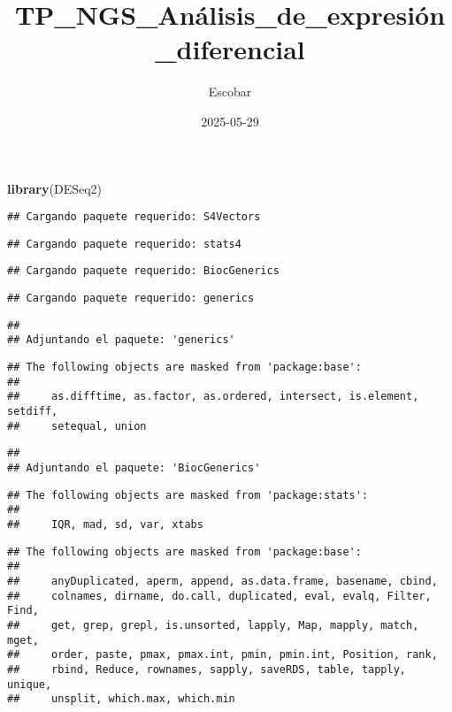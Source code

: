 \documentclass[
]{article}
\title{TP\_NGS\_Análisis\_de\_expresión\_diferencial}
\author{Escobar}
\date{2025-05-29}
\newenvironment{Shaded}{\begin{snugshade}}{\end{snugshade}}
\newcommand{\FunctionTok}[1]{\textcolor[rgb]{0.13,0.29,0.53}{\textbf{#1}}}
\newcommand{\NormalTok}[1]{#1}
\begin{document}
\maketitle

\begin{Shaded}
\begin{Highlighting}[]
\FunctionTok{library}\NormalTok{(DESeq2)}
\end{Highlighting}
\end{Shaded}

\begin{verbatim}
## Cargando paquete requerido: S4Vectors
\end{verbatim}

\begin{verbatim}
## Cargando paquete requerido: stats4
\end{verbatim}

\begin{verbatim}
## Cargando paquete requerido: BiocGenerics
\end{verbatim}

\begin{verbatim}
## Cargando paquete requerido: generics
\end{verbatim}

\begin{verbatim}
## 
## Adjuntando el paquete: 'generics'
\end{verbatim}

\begin{verbatim}
## The following objects are masked from 'package:base':
## 
##     as.difftime, as.factor, as.ordered, intersect, is.element, setdiff,
##     setequal, union
\end{verbatim}

\begin{verbatim}
## 
## Adjuntando el paquete: 'BiocGenerics'
\end{verbatim}

\begin{verbatim}
## The following objects are masked from 'package:stats':
## 
##     IQR, mad, sd, var, xtabs
\end{verbatim}

\begin{verbatim}
## The following objects are masked from 'package:base':
## 
##     anyDuplicated, aperm, append, as.data.frame, basename, cbind,
##     colnames, dirname, do.call, duplicated, eval, evalq, Filter, Find,
##     get, grep, grepl, is.unsorted, lapply, Map, mapply, match, mget,
##     order, paste, pmax, pmax.int, pmin, pmin.int, Position, rank,
##     rbind, Reduce, rownames, sapply, saveRDS, table, tapply, unique,
##     unsplit, which.max, which.min
\end{verbatim}
\end{document}
